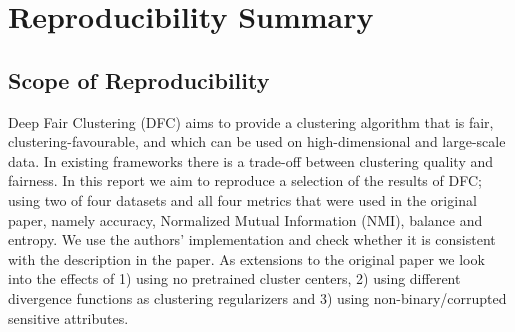 \section*{\centering Reproducibility Summary}


\subsection*{Scope of Reproducibility}



Deep Fair Clustering (DFC) aims to provide a clustering algorithm that is fair, clustering-favourable, and which can be used on high-dimensional and large-scale data. In existing frameworks there is a trade-off between clustering quality and fairness. 
In this report we aim to reproduce a selection of the results of DFC; using two of four datasets and all four metrics that were used in the original paper, namely accuracy, Normalized Mutual Information (NMI), balance and entropy.
We use the authors' implementation and check whether it is consistent with the description in the paper. As extensions to the original paper we look into the effects of 1) using no pretrained cluster centers, 2) using different divergence functions as clustering regularizers and 3) using non-binary/corrupted sensitive attributes.



